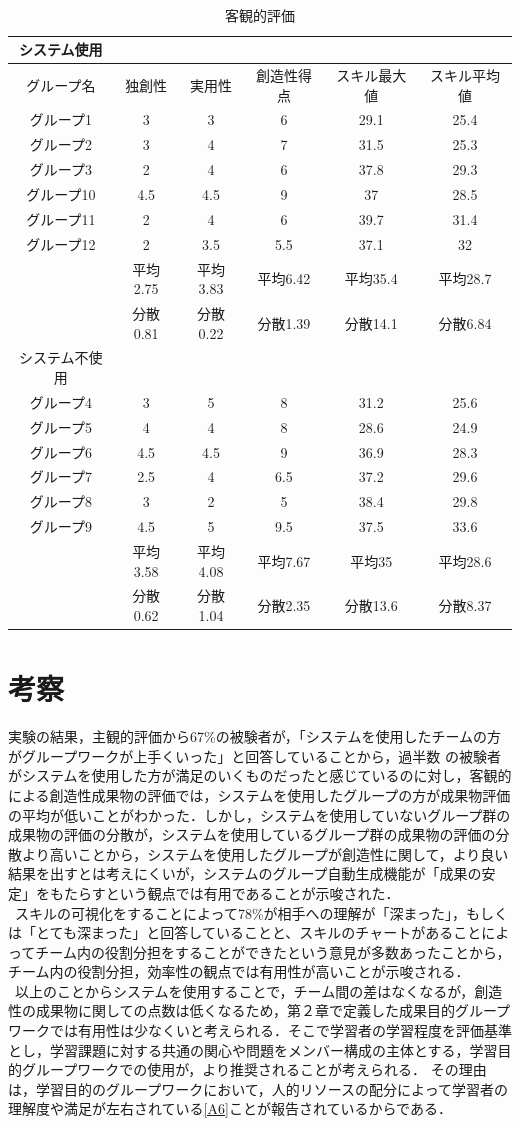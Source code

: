 \documentclass{funthesis}
\begin{document}
\ 
\begin{table}[H]
\begin{center}

  \caption{客観的評価}
  \begin{tabular}{cccccc} \hline
  システム使用\tabularnewline \hline
  グループ名&独創性&実用性&創造性得点
  &スキル最大値 & スキル平均値\tabularnewline \hline
    グループ1&3&3&6&29.1 &25.4\tabularnewline
    グループ2&3&4&7& 31.5&25.3 \tabularnewline
    グループ3&2&4&6 &37.8&29.3\tabularnewline
    グループ10&4.5&4.5&9&37&28.5 \tabularnewline
    グループ11&2&4&6&39.7&31.4 \tabularnewline
    グループ12&2&3.5&5.5&37.1&32 \tabularnewline \hline 
     &平均2.75&平均3.83&平均6.42&平均35.4&平均28.7\tabularnewline
    &分散0.81&分散0.22&分散1.39&分散14.1&分散6.84\tabularnewline 
      \hline \hline 
   システム不使用\tabularnewline \hline 
    グループ4&3&5&8&31.2&25.6 \tabularnewline
    グループ5&4&4&8&28.6&24.9 \tabularnewline
    グループ6&4.5&4.5&9 &36.9&28.3\tabularnewline
    グループ7&2.5&4&6.5&37.2&29.6 \tabularnewline
    グループ8&3&2&5 &38.4&29.8\tabularnewline
    グループ9&4.5&5&9.5&37.5&33.6 \tabularnewline
         \hline
         &平均3.58&平均4.08&平均7.67&平均35&平均28.6\tabularnewline 
    &分散0.62&分散1.04&分散2.35&分散13.6&分散8.37\tabularnewline \hline
  \end{tabular}
  \label{客観的評価}
  \end{center}
\end{table}

\section{考察}
実験の結果，主観的評価から67\%の被験者が，「システムを使用したチームの方がグループワークが上手くいった」と回答していることから，過半数
の被験者がシステムを使用した方が満足のいくものだったと感じているのに対し，客観的による創造性成果物の評価では，システムを使用したグループの方が成果物評価の平均が低いことがわかった．しかし，システムを使用していないグループ群の成果物の評価の分散が，システムを使用しているグループ群の成果物の評価の分散より高いことから，システムを使用したグループが創造性に関して，より良い結果を出すとは考えにくいが，システムのグループ自動生成機能が「成果の安定」をもたらすという観点では有用であることが示唆された．\\
\ スキルの可視化をすることによって78\%が相手への理解が「深まった」，もしくは「とても深まった」と回答していることと、スキルのチャートがあることによってチーム内の役割分担をすることができたという意見が多数あったことから，チーム内の役割分担，効率性の観点では有用性が高いことが示唆される．\\
\ 以上のことからシステムを使用することで，チーム間の差はなくなるが，創造性の成果物に関しての点数は低くなるため，第２章で定義した成果目的グループワークでは有用性は少なくいと考えられる．そこで学習者の学習程度を評価基準とし，学習課題に対する共通の関心や問題をメンバー構成の主体とする，学習目的グループワークでの使用が，より推奨されることが考えられる． その理由は，学習目的のグループワークにおいて，人的リソースの配分によって学習者の理解度や満足が左右されている\ref{A6}ことが報告されているからである．
\end{document}
